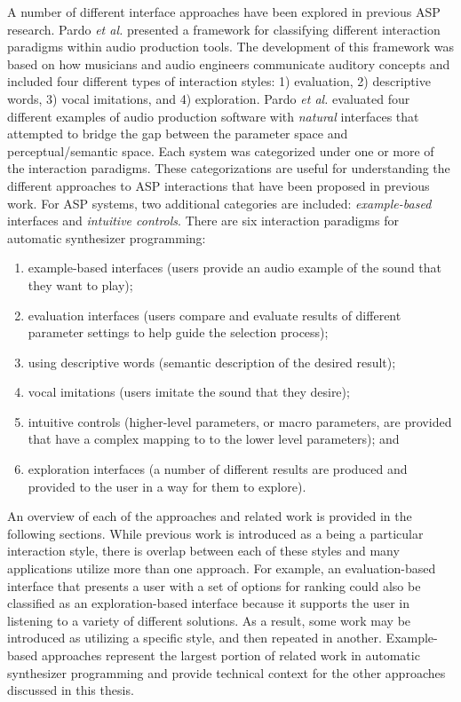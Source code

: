A number of different interface approaches have been explored in previous ASP research. Pardo \textit{et al.} \cite{pardo2019learning} presented a framework for classifying different interaction paradigms within audio production tools. The development of this framework was based on how musicians and audio engineers communicate auditory concepts and included four different types of interaction styles: 1) evaluation, 2) descriptive words, 3) vocal imitations, and 4) exploration. Pardo \textit{et al.} evaluated four different examples of audio production software with \textit{natural} interfaces that attempted to bridge the gap between the parameter space and perceptual/semantic space. Each system was categorized under one or more of the interaction paradigms. These categorizations are useful for understanding the different approaches to ASP interactions that have been proposed in previous work. For ASP systems, two additional categories are included: \textit{example-based} interfaces and \textit{intuitive controls}. There are six interaction paradigms for automatic synthesizer programming:

\begin{enumerate}
    \item example-based interfaces (users provide an audio example of the sound that they want to play);
    \item evaluation interfaces (users compare and evaluate results of different parameter settings to help guide the selection process);
    \item using descriptive words (semantic description of the desired result);
    \item vocal imitations (users imitate the sound that they desire);
    \item intuitive controls (higher-level parameters, or macro parameters, are provided that have a complex mapping to to the lower level parameters); and
    \item exploration interfaces (a number of different results are produced and provided to the user in a way for them to explore).
\end{enumerate}

An overview of each of the approaches and related work is provided in the following sections. While previous work is introduced as a being a particular interaction style, there is overlap between each of these styles and many applications utilize more than one approach. For example, an evaluation-based interface that presents a user with a set of options for ranking could also be classified as an exploration-based interface because it supports the user in listening to a variety of different solutions. As a result, some work may be introduced as utilizing a specific style, and then repeated in another. Example-based approaches represent the largest portion of related work in automatic synthesizer programming and provide technical context for the other approaches discussed in this thesis.

